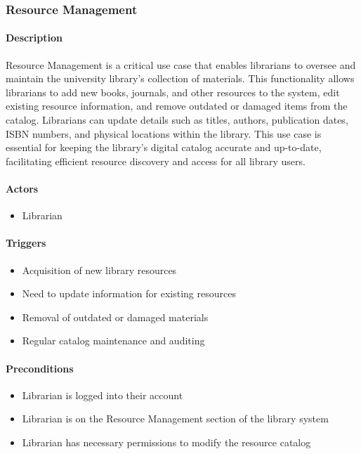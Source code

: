 \subsubsection{Resource Management}

\paragraph{Description}
Resource Management is a critical use case that enables librarians to oversee and maintain the university library's collection of materials. This functionality allows librarians to add new books, journals, and other resources to the system, edit existing resource information, and remove outdated or damaged items from the catalog. Librarians can update details such as titles, authors, publication dates, ISBN numbers, and physical locations within the library. This use case is essential for keeping the library's digital catalog accurate and up-to-date, facilitating efficient resource discovery and access for all library users.

\paragraph{Actors}
\begin{itemize}
    \item Librarian
\end{itemize}

\paragraph{Triggers}
\begin{itemize}
    \item Acquisition of new library resources
    \item Need to update information for existing resources
    \item Removal of outdated or damaged materials
    \item Regular catalog maintenance and auditing
\end{itemize}

\paragraph{Preconditions}
\begin{itemize}
    \item Librarian is logged into their account
    \item Librarian is on the Resource Management section of the library system
    \item Librarian has necessary permissions to modify the resource catalog
\end{itemize}

